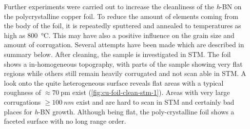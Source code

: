 Further experiments were carried out to increase the cleanliness of the \textit{h}-BN on the polycrystalline copper foil. To reduce the amount of elements coming from the body of the foil, it is repeatedly sputtered and annealed to temperatures as high as \SI{800}{\celsius}. This may have also a positive influence on the grain size and amount of corrugation. Several attempts have been made which are described in summary below.
After cleaning, the sample is investigated in STM. The foil shows a in-homogeneous topography, with parts of the sample showing very flat regions while others still remain heavily corrugated and not scan able in STM.  A look onto the quite heterogeneous surface reveals flat areas with a typical roughness of $\approx \SI{70}{\pico\meter}$ exist (\autoref{fig:cu-foil-clean-stm-1}). Areas with very large corrugations $\geq \SI{100}{nm}$ exist and are hard to scan in STM and certainly bad places for \textit{h}-BN growth. Although being flat, the poly-crystalline foil shows a faceted surface with no long range order.

